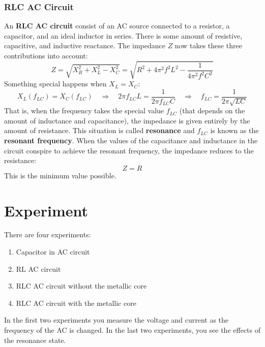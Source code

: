 \subsubsection{RLC AC Circuit}
An \textbf{RLC AC circuit} consist of an AC source connected to a resistor, a capacitor, and an ideal inductor in series. There is some amount of resistive, capacitive, and inductive reactance. The impedance $Z$ now takes these three contributions into account:
\begin{equation} \label{eq.06.eq.06.impedance.RLC}
	Z = \sqrt{X_{R}^{2} + X_{L}^{2} - X_{C}^{2}} = \sqrt{R^{2} + 4 \pi^{2} f^{2} L^{2} - \frac{1}{4 \pi^{2} f^{2} C^{2}}}
\end{equation}
Something special happens when $X_{L} = X_{C}$:
\begin{equation} \label{eq.06.resonant.frequency}
	X_{L}(f_{LC}) = X_{C}(f_{LC}) \quad \Longrightarrow \quad 2\pi f_{LC} L = \frac{1}{2\pi f_{LC} C} \quad \Longrightarrow \quad f_{LC} = \frac{1}{2 \pi \sqrt{LC}}
\end{equation}
That is, when the frequency takes the special value $f_{LC}$ (that depends on the amount of inductance and capacitance), the impedance is given entirely by the amount of resistance. This situation is called \textbf{resonance} and $f_{LC}$ is known as the \textbf{resonant frequency}. When the values of the capacitance and inductance in the circuit conspire to achieve the resonant frequency, the impedance reduces to the resistance:
\begin{equation}
	Z = R
\end{equation}
This is the minimum value possible.
\section{Experiment}
There are four experiments:
\begin{enumerate}
	\item Capacitor in AC circuit
	\item RL AC circuit
	\item RLC AC circuit without the metallic core
	\item RLC AC circuit with the metallic core
\end{enumerate}
In the first two experiments you measure the voltage and current as the frequency of the AC is changed. In the last two experiments, you see the effects of the resonance state.
